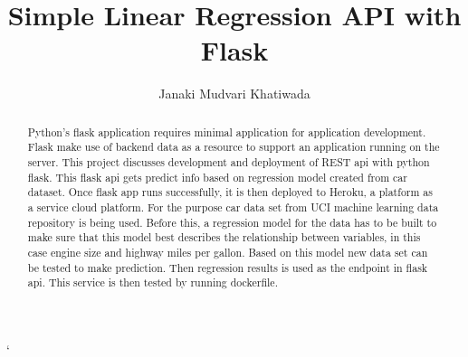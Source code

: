 \title{Simple Linear Regression API with Flask}



\author{Janaki Mudvari Khatiwada}


\renewcommand{\shortauthors}{J. M. Khatiwada}



\begin{abstract}
  Python's flask application requires minimal application for application
  development. Flask make use of backend data as a resource to support an
  application running on the server. This project discusses development
  and deployment of REST api with python flask. This flask api gets predict
  info based on regression model created from car dataset. Once flask app runs 
  successfully, it is then deployed to Heroku, a platform as a service 
  cloud platform. For the purpose car data set from UCI machine learning
  data repository is being used. Before this, a regression model for the
  data has to be built to make sure that this model best describes the 
  relationship between variables, in this case engine size and highway
  miles per gallon. Based on this model new data set can be tested to make 
  prediction. Then regression results is used as the endpoint 
  in flask api. This service is then tested by running dockerfile.
   
\end{abstract}



\maketitle`


